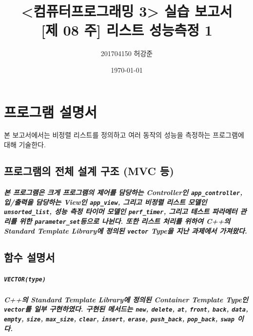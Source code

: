 \documentclass[UTF8, a4paper]{report}
\title{%
    <컴퓨터프로그래밍 3> 실습 보고서 \\ 
    \large [제 08 주] 리스트 성능측정 1}
\author{201704150 허강준}
\date{\today}
\begin{document}
    \maketitle
    \tableofcontents

    \chapter{프로그램 설명서}
        본 보고서에서는 비정렬 리스트를 정의하고 여러 동작의 성능을 측정하는 프로그램에 대해 기술한다.

        \section{프로그램의 전체 설계 구조 (MVC 등)}
            
            \paragraph{%
                \normalfont 본 프로그램은 크게 프로그램의 제어를 담당하는 Controller인 \texttt{app\_controller}, 입/출력을 담당하는 View인 \texttt{app\_view}, 그리고 비정렬 리스트 모델인 \texttt{unsorted\_list}, 성능 측정 타이머 모델인 \texttt{perf\_timer}, 그리고 테스트 파라메터 관리를 위한 \texttt{parameter\_set}등으로 나뉜다. 또한 리스트 처리를 위하여 C++의 Standard Template Library에 정의된 \texttt{vector} Type을 지난 과제에서 가져왔다.
            }
            
        \section{함수 설명서}
            
            \paragraph{\texttt{VECTOR(type)}}
            \paragraph{%
                \normalfont C++의 Standard Template Library에 정의된 Container Template Type인 \texttt{vector}를 일부 구현하였다. 구현된 메서드는 \texttt{new},  \texttt{delete}, \texttt{at}, \texttt{front}, \texttt{back}, \texttt{data}, \texttt{empty}, \texttt{size}, \texttt{max\_size}, \texttt{clear}, \texttt{insert}, \texttt{erase}, \texttt{push\_back}, \texttt{pop\_back}, \texttt{swap} 이다.
            }
\end{document}
